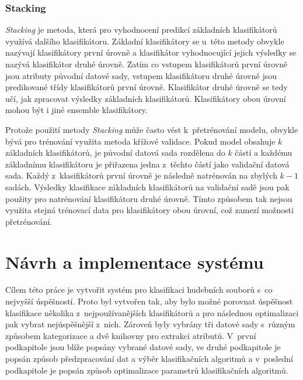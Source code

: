 \subsection*{Stacking}
\label{stacking}
\textit{Stacking} je metoda, která pro vyhodnocení predikcí základních klasifikátorů využívá dalšího klasifikátoru. Základní klasifikátory se u~této metody obvykle nazývají klasifikátory první úrovně a klasifikátor vyhodnocující jejich výsledky se nazývá klasifikátor druhé úrovně. Zatím co vstupem klasifikátorů první úrovně jsou atributy původní datové sady, vstupem klasifikátoru druhé úrovně jsou predikované třídy klasifikátorů první úrovně. Klasifikátor druhé úrovně se tedy učí, jak zpracovat výsledky základních klasifikátorů. Klasifikátory obou úrovní mohou být i jiné ensemble klasifikátory.\cite{data_classification}

Protože použití metody \textit{Stacking} může často vést k~přetrénování modelu, obvykle bývá pro trénování využita metoda křížové validace. Pokud model obsahuje $k$ základních klasifikátorů, je původní datová sada rozdělena do $k$ částí a každému základnímu klasifikátoru je přiřazena jedna z~těchto částí jako validační datová sada. Každý z~klasifikátorů první úrovně je následně natrénován na zbylých $k-1$ sadách. Výsledky klasifikace základních klasifikátorů na validační sadě jsou pak použity pro natrénování klasifikátoru druhé úrovně. Tímto způsobem tak nejsou využita stejná trénovací data pro klasifikátory obou úrovní, což zamezí možnosti přetrénování.\cite{data_classification}
























\chapter{Návrh a implementace systému}
\label{navrh_a_implementace_systemu}
Cílem této práce je vytvořit systém pro klasifikaci hudebních souborů s~co nejvyšší úspěšností. Proto byl vytvořen tak, aby bylo možné porovnat úspěšnost klasifikace několika z~nejpoužívanějších klasifikátorů a pro následnou optimalizaci pak vybrat nejúspěšnější z~nich. Zároveň byly vybrány tři datové sady s~různým způsobem kategorizace a dvě knihovny pro extrakci atributů. V~první podkapitole jsou blíže popsány vybrané datové sady, ve druhé podkapitole je popsán způsob předzpracování dat a výběr klasifikačních algoritmů a v~poslední podkapitole je popsán způsob optimalizace parametrů klasifikačních algoritmů.

